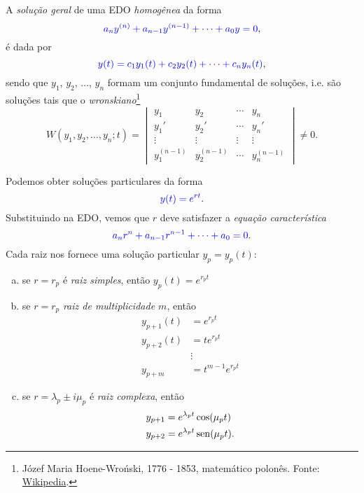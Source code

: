 A \emph{solução geral} de uma EDO \emph{homogênea} da forma
\begin{equation}
  {\color{blue}a_ny^{(n)} + a_{n-1}y^{(n-1)} + \cdots + a_0y = 0},
\end{equation}
é dada por
\begin{equation}
  {\color{blue}y(t) = c_1y_1(t) + c_2y_2(t) + \cdots + c_ny_n(t)},
\end{equation}
sendo que $y_1$, $y_2$, $\dotsc$, $y_n$ formam um conjunto fundamental de soluções, i.e. são soluções tais que o \emph{wronskiano}\footnote{Józef Maria Hoene-Wroński, 1776 - 1853, matemático polonês. Fonte: \href{https://en.wikipedia.org/w/index.php?title=J\%C3\%B3zef_Maria_Hoene-Wro\%C5\%84ski\&oldid=939986060}{Wikipedia}.}
\begin{equation}
  W(y_1,y_2,\dotsc,y_n;t) =
  \begin{vmatrix}
    y_1 & y_2 & \cdots & y_n \\
    y_1' & y_2' & \cdots & y_n' \\
    \vdots & \vdots & \vdots & \vdots \\
    y_1^{(n-1)} & y_2^{(n-1)} & \cdots & y_n^{(n-1)}
  \end{vmatrix} \neq 0.
\end{equation}


Podemos obter soluções particulares da forma
\begin{equation}
  {\color{blue}y(t) = e^{rt}}.
\end{equation}
Substituindo na EDO, vemos que $r$ deve satisfazer a \emph{equação característica}
\begin{equation}
  {\color{blue}a_nr^n + a_{n-1}r^{n-1} + \cdots + a_0 = 0}.
\end{equation}
Cada raiz nos fornece uma solução particular $y_p=y_p(t)$:
\begin{enumerate}[a)]
\item se $r = r_p$ é \emph{raiz simples}, então
  $y_p(t) = e^{r_pt}$
\item se $r = r_p$ \emph{raiz de multiplicidade $m$}, então
  \begin{align}
    y_{p+1}(t) &= e^{r_pt} \\
    y_{p+2}(t) &= te^{r_pt} \\
           &\vdots \\
    y_{p+m} &= t^{m-1}e^{r_pt}
  \end{align}
\item se $r = \lambda_p\pm i\mu_p$ é \emph{raiz complexa}, então
  \begin{align}
    y_{p+1} &= e^{\lambda_pt}\cos(\mu_pt) \\
    y_{p+2} &= e^{\lambda_pt}\operatorname{sen}(\mu_pt).
  \end{align}
\end{enumerate}

